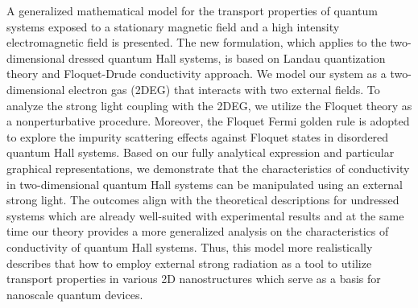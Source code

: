 A generalized mathematical model for the transport properties of quantum systems exposed to a stationary magnetic field and a high intensity electromagnetic field is presented. The new formulation, which applies to the two-dimensional dressed quantum Hall systems, is based on Landau quantization theory and Floquet-Drude conductivity approach. We model our system as a two-dimensional electron gas (2DEG) that interacts with two external fields. To analyze the strong light coupling with the 2DEG, we utilize the Floquet theory as a nonperturbative procedure. Moreover, the Floquet Fermi golden rule is adopted to explore the impurity scattering effects against Floquet states in disordered quantum Hall systems. Based on our fully analytical expression and particular graphical representations, we demonstrate that the characteristics of conductivity in two-dimensional quantum Hall systems can be manipulated using an external strong light. The outcomes align with the theoretical descriptions for undressed systems which are already well-suited with experimental results and at the same time our theory provides a more generalized analysis on the characteristics of conductivity of quantum Hall systems. Thus, this model more realistically describes that how to employ external strong radiation as a tool to utilize transport properties in various 2D nanostructures which serve as a basis for nanoscale quantum devices.

